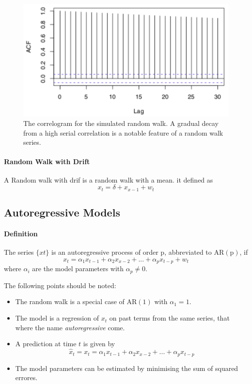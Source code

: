 \begin{figure}[!ht]
    \centering
    \includegraphics[scale=0.7]{src/SerieChronologique/RandomWalk-Correlogram.png}
    \caption{The correlogram for the simulated random walk. A gradual decay from a high serial correlation is a notable feature of a random walk series.}
\end{figure}

\paragraph{Random Walk with Drift}
A Random walk with drif is a random walk with a mean. it defined as
\[ x_t = \delta + x_{x-1} + w_t \] 

\subsection{Autoregressive Models}

\paragraph{Definition}
The series $\{xt\}$ is an autoregressive process of order p, abbreviated to $\mathrm{AR(p)}$, if
\[ x_t = \alpha_1 x_{t-1} + \alpha_2 x_{x-2} + ... + \alpha_p x_{t-p} + w_t \] 
where $\alpha_i$ are the model parameters with $\alpha_p \neq 0$.

The following points should be noted:
\begin{itemize} 
    \item[\textbullet] The random walk is a special case of $\mathrm{AR(1)}$ with $\alpha_1 = 1$.
    \item[\textbullet] The model is a regression of $x_t$ on past terms from the same series, that where the name \emph{autoregressive} come.
    \item[\textbullet] A prediction at time $t$ is given by
        \[ \hat{x}_t = x_t = \alpha_1 x_{t-1} + \alpha_2 x_{x-2} + ... + \alpha_p x_{t-p} \]
    \item[\textbullet] The model parameters can be estimated by minimising the sum of squared errores.
\end{itemize}

